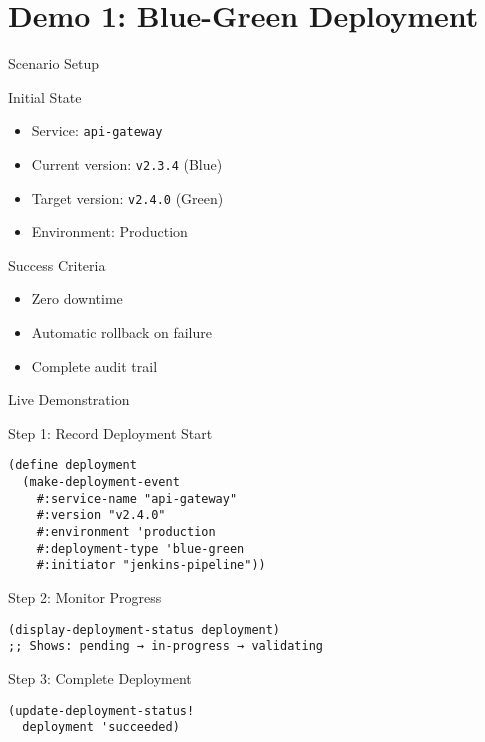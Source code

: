 \documentclass[presentation]{beamer}
\begin{document}
\section{Demo 1: Blue-Green Deployment}
\label{sec:org554cde1}
\begin{frame}[label={sec:orgb068f8a},fragile]{Scenario Setup}
 \begin{block}{Initial State}
\begin{itemize}
\item Service: \texttt{api-gateway}
\item Current version: \texttt{v2.3.4} (Blue)
\item Target version: \texttt{v2.4.0} (Green)
\item Environment: Production
\end{itemize}
\end{block}
\begin{block}{Success Criteria}
\begin{itemize}
\item Zero downtime
\item Automatic rollback on failure
\item Complete audit trail
\end{itemize}
\end{block}
\end{frame}
\begin{frame}[label={sec:org25adbaa},fragile]{Live Demonstration}
 \begin{block}{Step 1: Record Deployment Start}
\begin{verbatim}
(define deployment
  (make-deployment-event
    #:service-name "api-gateway"
    #:version "v2.4.0"
    #:environment 'production
    #:deployment-type 'blue-green
    #:initiator "jenkins-pipeline"))
\end{verbatim}
\end{block}
\begin{block}{Step 2: Monitor Progress}
\begin{verbatim}
(display-deployment-status deployment)
;; Shows: pending → in-progress → validating
\end{verbatim}
\end{block}
\begin{block}{Step 3: Complete Deployment}
\begin{verbatim}
(update-deployment-status!
  deployment 'succeeded)
\end{verbatim}
\end{block}
\end{frame}
\end{document}
